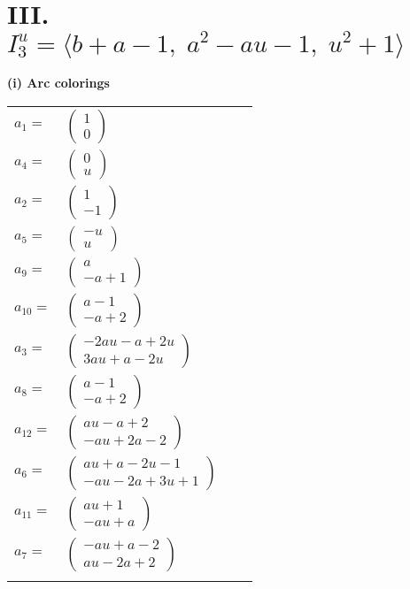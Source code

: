 \documentclass[1p]{elsarticle_modified}
\theoremstyle{definition}
\begin{document}
\centering \section*{III. $I^u_{3}= \langle b+a-1,\;a^2- a u-1,\;u^2+1 \rangle$}
\flushleft \textbf{(i) Arc colorings}\\
\begin{tabular}{m{7pt} m{180pt} m{7pt} m{180pt} }
\flushright $a_{1}=$&$\begin{pmatrix}1\\0\end{pmatrix}$ \\
\flushright $a_{4}=$&$\begin{pmatrix}0\\u\end{pmatrix}$ \\
\flushright $a_{2}=$&$\begin{pmatrix}1\\-1\end{pmatrix}$ \\
\flushright $a_{5}=$&$\begin{pmatrix}- u\\u\end{pmatrix}$ \\
\flushright $a_{9}=$&$\begin{pmatrix}a\\- a+1\end{pmatrix}$ \\
\flushright $a_{10}=$&$\begin{pmatrix}a-1\\- a+2\end{pmatrix}$ \\
\flushright $a_{3}=$&$\begin{pmatrix}-2 a u- a+2 u\\3 a u+a-2 u\end{pmatrix}$ \\
\flushright $a_{8}=$&$\begin{pmatrix}a-1\\- a+2\end{pmatrix}$ \\
\flushright $a_{12}=$&$\begin{pmatrix}a u- a+2\\- a u+2 a-2\end{pmatrix}$ \\
\flushright $a_{6}=$&$\begin{pmatrix}a u+a-2 u-1\\- a u-2 a+3 u+1\end{pmatrix}$ \\
\flushright $a_{11}=$&$\begin{pmatrix}a u+1\\- a u+a\end{pmatrix}$ \\
\flushright $a_{7}=$&$\begin{pmatrix}- a u+a-2\\a u-2 a+2\end{pmatrix}$\\&\end{tabular}
\end{document}
